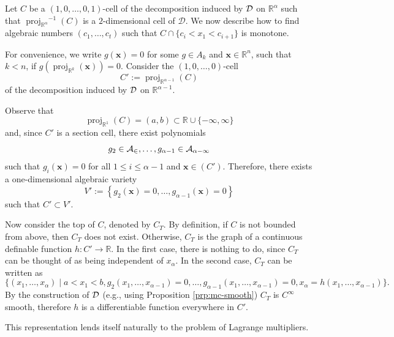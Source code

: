 \documentclass[
]{book}
\theoremstyle{definition}
\theoremstyle{definition}
\theoremstyle{definition}
\theoremstyle{definition}
\theoremstyle{remark}
\begin{document}
Let \(C\) be a \((1,0,\ldots,0,1)\)-cell of the decomposition induced by \(\cal D\) on \(\mathbb{R}^{\alpha}\) such that \({\operatorname{proj}_{\mathbb{R}^{\alpha}}}^{-1}(C)\) is a \(2\)-dimensional cell of \(\mathcal{D}\).
We now describe how to find algebraic numbers \((c_1,\ldots,c_t)\) such that \(C \cap \{ c_i < x_1 < c_{i+1} \}\) is monotone.

For convenience, we write \(g(\mathbf{x}) = 0\) for some \(g \in A_k\) and \(\mathbf{x} \in \mathbb{R}^n\), such that \(k < n\), if \(g({\operatorname{proj}_{\mathbb{R}^{k}}}(\mathbf{x})) = 0\).
Consider the \((1,0,\ldots,0)\)-cell
\[
C' := {\operatorname{proj}_{\mathbb{R}^{\alpha - 1}}}(C)
\]
of the decomposition induced by \(\cal D\) on \(\mathbb{R}^{\alpha - 1}\).

Observe that
\[
{\operatorname{proj}_{\mathbb{R}^{1}}}(C) = (a,b) \subset \mathbb{R}\cup \{-\infty, \infty\}
\]
and, since \(C'\) is a section cell, there exist polynomials
\[
g_2 \in {\cal A_2},\ldots,g_{\alpha - 1} \in {\cal A_{\alpha - 1}}
\] such that \(g_i(\mathbf{x}) = 0\) for all \(1\le i \le \alpha - 1\) and \(\mathbf{x} \in (C')\).
Therefore, there exists a one-dimensional algebraic variety
\[
V' := \left\{ g_2(\mathbf{x}) = 0, \ldots, g_{\alpha - 1}(\mathbf{x}) = 0 \right\}
\]
such that \(C' \subset V'\).

Now consider the top of \(C\), denoted by \(C_T\).
By definition, if \(C\) is not bounded from above, then \(C_T\) does not exist. Otherwise, \(C_T\) is the graph of a continuous definable function \(h : C' \to \mathbb{R}\).
In the first case, there is nothing to do, since \(C_T\) can be thought of as being independent of \(x_\alpha\).
In the second case, \(C_T\) can be written as
\begin{equation}
\{ (x_1,\ldots,x_\alpha) \mid a < x_1 < b, g_2(x_1,\ldots,x_{\alpha - 1}) = 0, \ldots, g_{\alpha - 1}(x_1,\ldots,x_{\alpha - 1}) = 0, x_\alpha = h(x_1,\ldots,x_{\alpha - 1}) \}.
\label{eq:c-alpha-top}
\end{equation}
By the construction of \(\cal D\) (e.g., using Proposition \ref{prp:mc-smooth}) \(C_T\) is \(C^\infty\) smooth, therefore \(h\) is a differentiable function everywhere in \(C'\).

This representation lends itself naturally to the problem of Lagrange multipliers.
\end{document}
